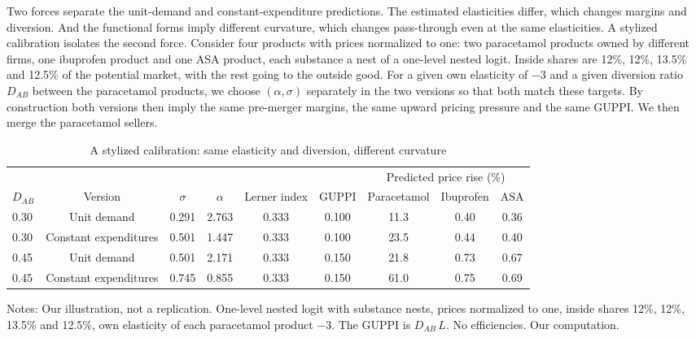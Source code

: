  Two forces separate the unit-demand and constant-expenditure predictions.
The estimated elasticities differ, which changes margins and diversion. And the functional forms imply different
curvature, which changes pass-through even at the same elasticities. A stylized calibration isolates the second
force. Consider four products with prices normalized to one: two paracetamol products owned by different firms, one
ibuprofen product and one ASA product, each substance a nest of a one-level nested logit. Inside shares are 12\%,
12\%, 13.5\% and 12.5\% of the potential market, with the rest going to the outside good. For a given own elasticity
of $-3$ and a given diversion ratio $D_{AB}$ between the paracetamol products, we choose $(\alpha,\sigma)$
separately in the two versions so that both match these targets. By construction both versions then imply the same
pre-merger margins, the same upward pricing pressure and the same GUPPI. We then merge the paracetamol sellers.

\begin{table}[htbp]
\centering
\caption{A stylized calibration: same elasticity and diversion, different curvature}
\label{tab:11-bvcurv}
\footnotesize
\begin{tabular}{@{}lcccccccc@{}}
\toprule
& & & & & & \multicolumn{3}{c}{Predicted price rise (\%)} \\
\cmidrule(l){7-9}
$D_{AB}$ & Version & $\sigma$ & $\alpha$ & Lerner index & GUPPI & Paracetamol & Ibuprofen & ASA \\
\midrule
0.30 & Unit demand & 0.291 & 2.763 & 0.333 & 0.100 & 11.3 & 0.40 & 0.36 \\
0.30 & Constant expenditures & 0.501 & 1.447 & 0.333 & 0.100 & 23.5 & 0.44 & 0.40 \\
0.45 & Unit demand & 0.501 & 2.171 & 0.333 & 0.150 & 21.8 & 0.73 & 0.67 \\
0.45 & Constant expenditures & 0.745 & 0.855 & 0.333 & 0.150 & 61.0 & 0.75 & 0.69 \\
\bottomrule
\end{tabular}

\smallskip
\begin{minipage}{0.97\linewidth}
\footnotesize Notes: Our illustration, not a replication. One-level nested logit with substance nests, prices
normalized to one, inside shares 12\%, 12\%, 13.5\% and 12.5\%, own elasticity of each paracetamol product $-3$.
The GUPPI is $D_{AB}\,L$. No efficiencies. Our computation.
\end{minipage}
\end{table}


